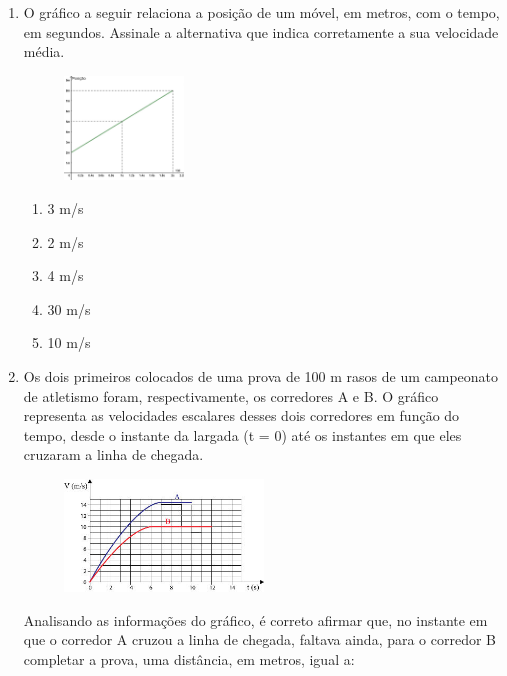 \documentclass[12pt,letterpaper,fleqn]{article}
\begin{document}
\begin{enumerate}
    \item O gráfico a seguir relaciona a posição de um móvel, em metros, com o tempo, em segundos. Assinale a alternativa que indica corretamente a sua velocidade média.
    
    \begin{figure}[h]
        \centering
        \includegraphics[width=0.3\textwidth]{grafico-de-posicao-movimento-uniforme-exercicio-1.jpg}
        \label{fig:ex_1}
    \end{figure}
    
    \begin{enumerate}
        \item 3 m/s
        \item 2 m/s
        \item 4 m/s
        \item 30 m/s
        \item 10 m/s
    \end{enumerate}
    
    \item Os dois primeiros colocados de uma prova de 100 m rasos de um campeonato de atletismo foram, respectivamente, os corredores A e B. O gráfico representa as velocidades escalares desses dois corredores em função do tempo, desde o instante da largada (t = 0) até os instantes em que eles cruzaram a linha de chegada.
    
    \begin{figure}[h]
        \centering
        \includegraphics[width=0.5\textwidth]{grafico-corredores.jpg}
        \label{fig:ex_2}
    \end{figure}
    
    Analisando as informações do gráfico, é correto afirmar que, no instante em que o corredor A
cruzou a linha de chegada, faltava ainda, para o corredor B completar a prova, uma distância,
em metros, igual a:
    

\end{enumerate}
\end{document}
